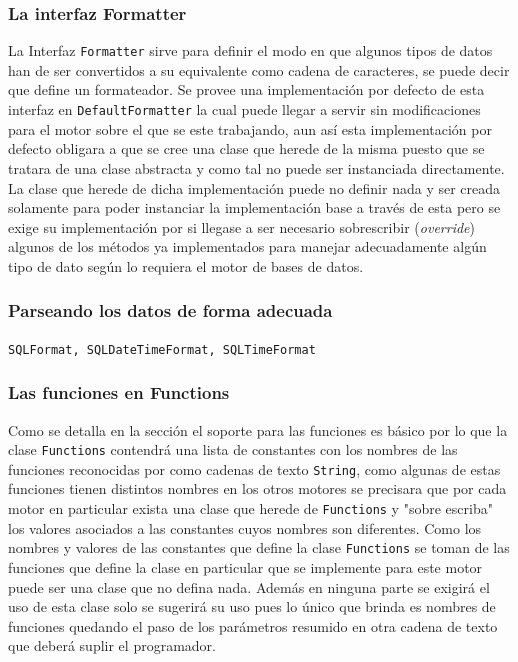 \subsubsection{La interfaz Formatter}
La Interfaz \verb=Formatter= sirve para definir el modo en que algunos tipos de datos han de ser convertidos a su equivalente como cadena de caracteres, se puede decir que define un formateador. Se provee una implementación por defecto de esta interfaz en \verb=DefaultFormatter= la cual puede llegar a servir sin modificaciones para el motor sobre el que se este trabajando, aun así esta implementación por defecto obligara a que se cree una clase que herede de la misma puesto que se tratara de una clase abstracta y como tal no puede ser instanciada directamente. La clase que herede de dicha implementación puede no definir nada y ser creada solamente para poder instanciar la implementación base a través de esta pero se exige su implementación por si llegase a ser necesario sobrescribir (\textit{override}) algunos de los métodos ya implementados para manejar adecuadamente algún tipo de dato según lo requiera el motor de bases de datos.
%
\subsubsection{Parseando los datos de forma adecuada}
\verb=SQLFormat, SQLDateTimeFormat, SQLTimeFormat=
%
\subsubsection{Las funciones  en Functions}
Como se detalla en la sección  el soporte para las funciones es básico por lo que la clase \verb=Functions= contendrá una lista de constantes con los nombres de las funciones reconocidas por \jj como cadenas de texto \verb=String=, como algunas de estas funciones tienen distintos nombres en los otros motores se precisara que por cada motor en particular exista una clase que herede de \verb=Functions= y "sobre escriba" los valores asociados a las constantes cuyos nombres son diferentes. Como los nombres y valores de las constantes que define la clase \verb=Functions= se toman de las funciones que define \s la clase en particular que se implemente para este motor puede ser una clase que no defina nada. Además en ninguna parte se exigirá el uso de esta clase solo se sugerirá su uso pues lo único que brinda es nombres de funciones quedando el paso de los parámetros resumido en otra cadena de texto que deberá suplir el programador.  
%
